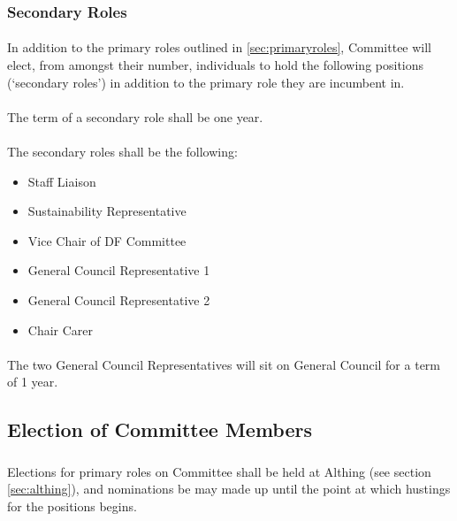 \documentclass[a4paper, 11pt]{report}
\begin{document}
\subsubsection{Secondary Roles}
\label{sec:secondaryroles}

\paragraph{} In addition to the primary roles outlined in \ref{sec:primaryroles}, Committee will elect, from amongst their number, individuals to hold the following positions (`secondary roles') in addition to the primary role they are incumbent in.

\paragraph{} The term of a secondary role shall be one year.

\paragraph{} The secondary roles shall be the following:

\begin{itemize}
\item Staff Liaison
\item Sustainability Representative
\item Vice Chair of DF Committee
\item General Council Representative 1
\item General Council Representative 2
\item Chair Carer
\end{itemize}

\paragraph{} The two General Council Representatives will sit on General Council for a term of 1 year.

\subsection{Election of Committee Members}
\label{sec:election}
\subsubsection{}
Elections for primary roles on Committee shall be held at Althing (see section \ref{sec:althing}), and nominations be may made up until the point at which hustings for the positions begins.
\end{document}
